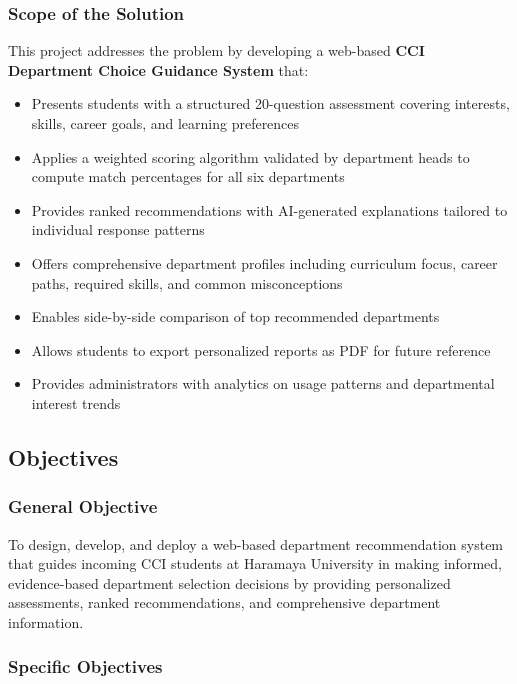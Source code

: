 \documentclass[12pt, a4paper]{article}
\begin{document}
\subsubsection*{Scope of the Solution}

This project addresses the problem by developing a web-based \textbf{CCI Department Choice Guidance System} that:

\begin{itemize}[leftmargin=1.5em, itemsep=3pt]
    \item Presents students with a structured 20-question assessment covering interests, skills, career goals, and learning preferences
    \item Applies a weighted scoring algorithm validated by department heads to compute match percentages for all six departments
    \item Provides ranked recommendations with AI-generated explanations tailored to individual response patterns
    \item Offers comprehensive department profiles including curriculum focus, career paths, required skills, and common misconceptions
    \item Enables side-by-side comparison of top recommended departments
    \item Allows students to export personalized reports as PDF for future reference
    \item Provides administrators with analytics on usage patterns and departmental interest trends
\end{itemize}

\subsection{Objectives}

\subsubsection*{General Objective}

To design, develop, and deploy a web-based department recommendation system that guides incoming CCI students at Haramaya University in making informed, evidence-based department selection decisions by providing personalized assessments, ranked recommendations, and comprehensive department information.

\subsubsection*{Specific Objectives}
\end{document}
